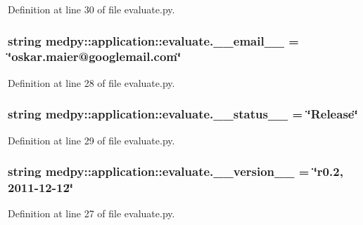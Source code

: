 Definition at line 30 of file evaluate.py.

\hypertarget{namespacemedpy_1_1application_1_1evaluate_aa69048efa7ef78658a9e17beafa72c38}{
\subsubsection[{\_\-\_\-email\_\-\_\-}]{\setlength{\rightskip}{0pt plus 5cm}string {\bf medpy::application::evaluate.\_\-\_\-email\_\-\_\-} = \char`\"{}oskar.maier@googlemail.com\char`\"{}}}
\label{namespacemedpy_1_1application_1_1evaluate_aa69048efa7ef78658a9e17beafa72c38}


Definition at line 28 of file evaluate.py.

\hypertarget{namespacemedpy_1_1application_1_1evaluate_ac95b6fe7d344d64e9db37627786007b4}{
\subsubsection[{\_\-\_\-status\_\-\_\-}]{\setlength{\rightskip}{0pt plus 5cm}string {\bf medpy::application::evaluate.\_\-\_\-status\_\-\_\-} = \char`\"{}Release\char`\"{}}}
\label{namespacemedpy_1_1application_1_1evaluate_ac95b6fe7d344d64e9db37627786007b4}


Definition at line 29 of file evaluate.py.

\hypertarget{namespacemedpy_1_1application_1_1evaluate_a3fc765e9b0abd4638062745314be044b}{
\subsubsection[{\_\-\_\-version\_\-\_\-}]{\setlength{\rightskip}{0pt plus 5cm}string {\bf medpy::application::evaluate.\_\-\_\-version\_\-\_\-} = \char`\"{}r0.2, 2011-\/12-\/12\char`\"{}}}
\label{namespacemedpy_1_1application_1_1evaluate_a3fc765e9b0abd4638062745314be044b}


Definition at line 27 of file evaluate.py.

